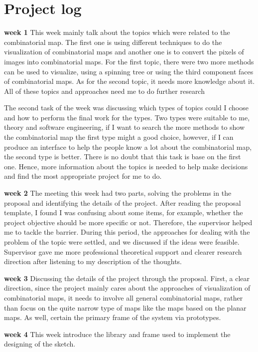 \chapter{Project log}
\label{chap:Appendix:B}
\textbf{week 1} This week mainly talk about the topics which were related to the combinatorial map. The first one is using different techniques to do the visualization of combinatorial maps and another one is to convert the pixels of images into combinatorial maps. For the first topic, there were two more methods can be used to visualize, using a spinning tree or using the third component faces of combinatorial maps.  As for the second topic, it needs more knowledge about it. All of these topics and approaches need me to do further research

The second task of the week was discussing which types of topics could I choose and how to perform the final work for the types. Two types were suitable to me, theory and software engineering, if I want to search the more methods to show the combinatorial map the first type might a good choice, however, if I can produce an interface to help the people know a lot about the combinatorial map, the second type is better. There is no doubt that this task is base on the first one. Hence, more information about the topics is needed to help make decisions and find the most appropriate project for me to do.

\textbf{week 2} The meeting this week had two parts, solving the problems in the proposal and identifying the details of the project.  After reading the proposal template, I found I was confusing about some items, for example, whether the project objective should be more specific or not. Therefore, the supervisor helped me to tackle the barrier. During this period, the approaches for dealing with the problem of the topic were settled, and we discussed if the ideas were feasible. Supervisor gave me more professional theoretical support and clearer research direction after listening to my description of the thoughts. 

\textbf{week 3} Discussing the details of the project through the proposal. First, a clear direction, since the project mainly cares about the approaches of visualization of combinatorial maps, it needs to involve all general combinatorial maps, rather than focus on the quite narrow type of maps like the maps based on the planar maps. As well,  certain the primary frame of the system via prototypes. 

\textbf{week 4} This week introduce the library and frame used to implement the designing of the sketch.

